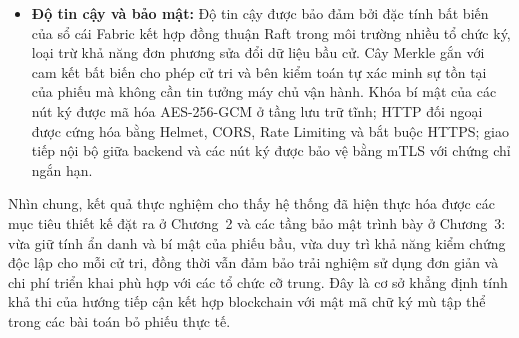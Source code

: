 \begin{itemize}
    \item \textbf{Độ tin cậy và bảo mật:} Độ tin cậy được bảo đảm bởi đặc tính bất biến của sổ cái Fabric kết hợp đồng thuận Raft trong môi trường nhiều tổ chức ký, loại trừ khả năng đơn phương sửa đổi dữ liệu bầu cử. Cây Merkle gắn với cam kết bất biến cho phép cử tri và bên kiểm toán tự xác minh sự tồn tại của phiếu mà không cần tin tưởng máy chủ vận hành. Khóa bí mật của các nút ký được mã hóa AES-256-GCM ở tầng lưu trữ tĩnh; HTTP đối ngoại được cứng hóa bằng Helmet, CORS, Rate Limiting và bắt buộc HTTPS; giao tiếp nội bộ giữa backend và các nút ký được bảo vệ bằng mTLS với chứng chỉ ngắn hạn.
\end{itemize}

Nhìn chung, kết quả thực nghiệm cho thấy hệ thống đã hiện thực hóa được các mục tiêu thiết kế đặt ra ở Chương~2 và các tầng bảo mật trình bày ở Chương~3: vừa giữ tính ẩn danh và bí mật của phiếu bầu, vừa duy trì khả năng kiểm chứng độc lập cho mỗi cử tri, đồng thời vẫn đảm bảo trải nghiệm sử dụng đơn giản và chi phí triển khai phù hợp với các tổ chức cỡ trung. Đây là cơ sở khẳng định tính khả thi của hướng tiếp cận kết hợp blockchain với mật mã chữ ký mù tập thể trong các bài toán bỏ phiếu thực tế.
